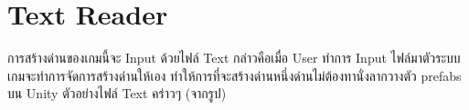 \section{Text Reader}
การสร้างด่านของเกมนี้จะ Input ด้วยไฟล์ Text กล่าวคือเมื่อ User ทำการ Input ไฟล์มาตัวระบบเกมจะทำการจัดการสร้างด่านให้เอง
ทำให้การที่จะสร้างด่านหนึ่งด่านไม่ต้องทานั่งลากวางตัว prefabs บน Unity ตัวอย่างไฟล์ Text คร่าวๆ (จากรูป)